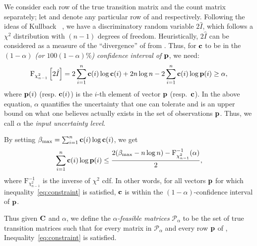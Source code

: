 We consider each row of the true transition matrix and the count matrix
separately; let {\rowp} and {\rowc} denote
any particular row of {\truetransitionmatrix} and {\countmatrix} respectively.  
Following the ideas of Kullback {\etal}~\cite{kullback62tests}, we have a discriminatory random variable $2\hat{I}$, which follows a $\chi^2$ distribution with $(n-1)$ degrees of freedom. Heuristically, $2\hat{I}$ can be considered as a measure of the ``divergence'' of {\rowc} from {\rowp}.
Thus, 
for $\mathbf{c}$ to be in the  \emph{$(1-\alpha)$ (or $100(1-\alpha)\%$) 
confidence interval of $\mathbf{p}$}, we need:
\begin{equation*}\label{eq:ul}
\text{F}_{\chi^2_{n-1}}\left[2\hat{I}\right] =  2\sum_{i=1}^n\mathbf{c}(i)\log\mathbf{c}(i)+2n\log n -2\sum_{i=1}^n\mathbf{c}(i)\log\mathbf{p}(i) \geq \alpha,
\end{equation*}
where 
 $\mathbf{p}(i)$ (resp. $\mathbf{c}(i)$) is the $i$-th element of vector $\mathbf{p}$ (resp.\ $\mathbf{c}$).
 In the above equation, $\alpha$ quantifies the uncertainty that
 one can tolerate and is an upper bound on what one believes actually exists in the set of observations $\mathbf{p}$. 
Thus, we call $\alpha$ the \emph{input uncertainty level}.
 
By setting $\beta_\text{max} = \sum_{i=1}^n\mathbf{c}(i)\log \mathbf{c}(i)$,
we get
\begin{equation}\label{eq:constraint}
\sum_{i=1}^n\mathbf{c}(i)\log\mathbf{p}(i) \leq \frac{2(\beta_\text{max}-n\log n)-\text{F}^{-1}_{\chi^2_{n-1}}(\alpha)}{2},
\end{equation}
where $\text{F}^{-1}_{\chi^2_{n-1}}$ is the inverse of $\chi^2$ cdf. 
In other words, for all vectors $\mathbf{p}$ for which inequality~\eqref{eq:constraint}
is satisfied, $\mathbf{c}$ is within the $(1-\alpha)$-confidence interval of $\mathbf{p}$.

Thus given ${\mathbf{C}}$ and $\alpha$, we define 
the \emph{$\alpha$-feasible
matrices} $\mathcal{P}_{\alpha}$ to be 
the 
set of true transition matrices  such that
for every matrix {\truetransitionmatrix} in $\mathcal{P}_{\alpha}$
and every row $\mathbf{p}$ of {\truetransitionmatrix}, Inequality~\eqref{eq:constraint}
is satisfied.



